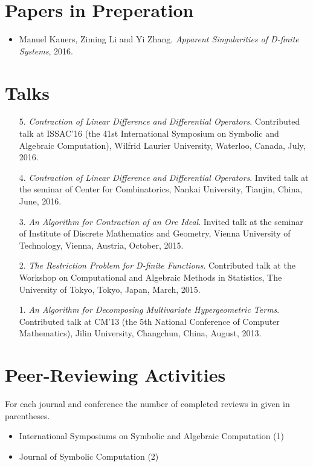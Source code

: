 \documentclass[a4paper,12pt]{article}
\begin{document}
\section*{\Large{Papers in Preperation}}
\begin{itemize}
 \item Manuel Kauers, Ziming Li and Yi Zhang. {\em Apparent Singularities of D-finite Systems}, 2016. 
\end{itemize}

\section*{\Large{Talks}}
\begin{itemize}
 \item[5.] {\em Contraction of Linear Difference and Differential Operators}. Contributed talk at ISSAC'16 
 (the 41st International Symposium on Symbolic and Algebraic Computation), Wilfrid Laurier University, Waterloo, Canada, July, 2016.
 \item[4.] {\em Contraction of Linear Difference and Differential Operators}.
       Invited talk at the seminar of Center for Combinatorics, Nankai University, Tianjin, China, June, 2016.
 \item[3.] {\em An Algorithm for Contraction of an Ore Ideal}. Invited talk at the seminar of Institute of Discrete Mathematics and Geometry, 
       Vienna University of Technology, Vienna, Austria, October, 2015.
 \item[2.] {\em The Restriction Problem for D-finite Functions}. 
       Contributed talk at the Workshop on Computational and Algebraic Methods in Statistics,
       The University of Tokyo, Tokyo, Japan, March, 2015.
 \item[1.] {\em An Algorithm for Decomposing Multivariate Hypergeometric Terms}. Contributed talk at CM'13
       (the 5th National Conference of Computer Mathematics), Jilin University, Changchun, China, August, 2013.
\end{itemize}

\section*{\Large Peer-Reviewing Activities}
For each journal and conference the number of completed reviews in given in parentheses.
\begin{itemize}
 \item International Symposiums on Symbolic and Algebraic Computation (1)
 \item Journal of Symbolic Computation (2)
\end{itemize}
\end{document}
